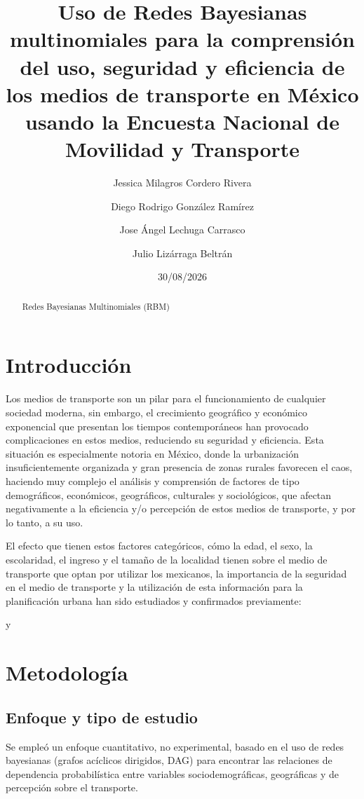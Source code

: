\documentclass[
  letterpaper,
  DIV=11,
  numbers=noendperiod]{scrartcl}
\title{Uso de Redes Bayesianas multinomiales para la comprensión del uso, seguridad y eficiencia de los medios de transporte en México usando la Encuesta Nacional de Movilidad y Transporte}
\author{
Jessica Milagros Cordero Rivera
\and
Diego Rodrigo González Ramírez
\and
Jose Ángel Lechuga Carrasco
\and
Julio Lizárraga Beltrán
}
\date{30/08/2026}
\begin{document}
\maketitle


\begin{abstract}
Redes Bayesianas Multinomiales (RBM)
\end{abstract}



\section{Introducción}\label{Introducción}
Los medios de transporte son un pilar para el funcionamiento de cualquier sociedad 
moderna, sin embargo, el crecimiento geográfico y económico exponencial que presentan 
los tiempos contemporáneos han provocado complicaciones en estos medios, reduciendo su 
seguridad y eficiencia. Esta situación es especialmente notoria en México, donde la 
urbanización insuficientemente organizada y gran presencia de zonas rurales favorecen 
el caos, haciendo muy complejo el análisis y comprensión de factores de tipo 
demográficos, económicos, geográficos, culturales y sociológicos, que afectan 
negativamente a la eficiencia y/o percepción de estos medios de transporte, 
y por lo tanto, a su uso.

El efecto que tienen estos factores categóricos, cómo la edad, el sexo, la 
escolaridad, el ingreso y el tamaño de la localidad tienen sobre el medio de 
transporte que optan por utilizar los mexicanos, la importancia de la seguridad 
en el medio de transporte y la utilización de esta información para la planificación 
urbana han sido estudiados y confirmados previamente:

\cite{Harbering2020} y \cite{BautistaHernandez2021} 

\cite{Moreno2023}

\cite{ObregonBiosca2018}


\section{Metodología}\label{Metodología}
\subsection{Enfoque y tipo de estudio}
Se empleó un enfoque cuantitativo, no experimental, basado en el uso de redes bayesianas (grafos acíclicos dirigidos, DAG) para encontrar las relaciones de dependencia probabilística entre variables sociodemográficas, geográficas y de percepción sobre el transporte.
\end{document}
